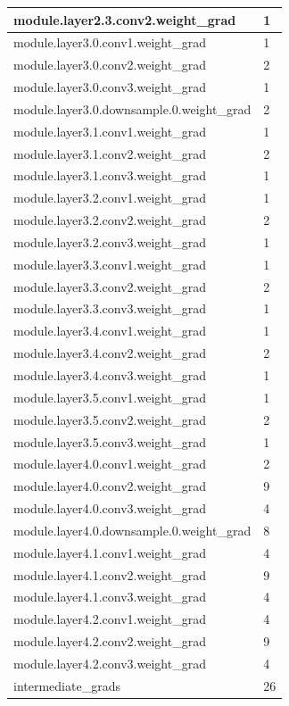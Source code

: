 \documentclass[12pt,letterpaper]{article}
\begin{document}
\begin{appendices}
\begin{longtable}{@{}ll@{}}
module.layer2.3.conv2.weight\_grad        & 1    \\ \midrule
module.layer3.0.conv1.weight\_grad        & 1    \\ \midrule
module.layer3.0.conv2.weight\_grad        & 2    \\ \midrule
module.layer3.0.conv3.weight\_grad        & 1    \\ \midrule
module.layer3.0.downsample.0.weight\_grad & 2    \\ \midrule
module.layer3.1.conv1.weight\_grad        & 1    \\ \midrule
module.layer3.1.conv2.weight\_grad        & 2    \\ \midrule
module.layer3.1.conv3.weight\_grad        & 1    \\ \midrule
module.layer3.2.conv1.weight\_grad        & 1    \\ \midrule
module.layer3.2.conv2.weight\_grad        & 2    \\ \midrule
module.layer3.2.conv3.weight\_grad        & 1    \\ \midrule
module.layer3.3.conv1.weight\_grad        & 1    \\ \midrule
module.layer3.3.conv2.weight\_grad        & 2    \\ \midrule
module.layer3.3.conv3.weight\_grad        & 1    \\ \midrule
module.layer3.4.conv1.weight\_grad        & 1    \\ \midrule
module.layer3.4.conv2.weight\_grad        & 2    \\ \midrule
module.layer3.4.conv3.weight\_grad        & 1    \\ \midrule
module.layer3.5.conv1.weight\_grad        & 1    \\ \midrule
module.layer3.5.conv2.weight\_grad        & 2    \\ \midrule
module.layer3.5.conv3.weight\_grad        & 1    \\ \midrule
module.layer4.0.conv1.weight\_grad        & 2    \\ \midrule
module.layer4.0.conv2.weight\_grad        & 9    \\ \midrule
module.layer4.0.conv3.weight\_grad        & 4    \\ \midrule
module.layer4.0.downsample.0.weight\_grad & 8    \\ \midrule
module.layer4.1.conv1.weight\_grad        & 4    \\ \midrule
module.layer4.1.conv2.weight\_grad        & 9    \\ \midrule
module.layer4.1.conv3.weight\_grad        & 4    \\ \midrule
module.layer4.2.conv1.weight\_grad        & 4    \\ \midrule
module.layer4.2.conv2.weight\_grad        & 9    \\ \midrule
module.layer4.2.conv3.weight\_grad        & 4    \\ \midrule
intermediate\_grads                       & 26   \\ \bottomrule
\end{longtable}
\newpage



\end{appendices}
\end{document}

